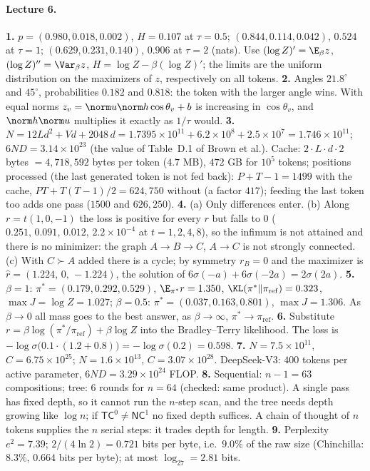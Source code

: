 \paragraph{Lecture 6.}
\textbf{1.} $p=(0.980,0.018,0.002)$, $H=0.107$ at $\tau=0.5$; $(0.844,0.114,0.042)$, $0.524$ at $\tau=1$; $(0.629,0.231,0.140)$, $0.906$ at $\tau=2$ (nats). Use $(\log Z)'=\E_\beta z$, $(\log Z)''=\Var_\beta z$, $H=\log Z-\beta(\log Z)'$; the limits are the uniform distribution on the maximizers of $z$, respectively on all tokens. \quad
\textbf{2.} Angles $21.8^\circ$ and $45^\circ$, probabilities $0.182$ and $0.818$: the token with the larger angle wins. With equal norms $z_v=\norm u\norm h\cos\theta_v+b$ is increasing in $\cos\theta_v$, and $\norm h\norm u$ multiplies it exactly as $1/\tau$ would. \quad
\textbf{3.} $N=12Ld^2+Vd+2048\,d=1.7395\times10^{11}+6.2\times10^{8}+2.5\times10^{7}=1.746\times10^{11}$; $6ND=3.14\times10^{23}$ (the value of Table~D.1 of Brown et al.). Cache: $2\cdot L\cdot d\cdot2$ bytes $=4{,}718{,}592$ bytes per token ($4.7$ MB), $472$ GB for $10^5$ tokens; positions processed (the last generated token is not fed back): $P+T-1=1499$ with the cache, $PT+T(T-1)/2=624{,}750$ without (a factor $417$); feeding the last token too adds one pass ($1500$ and $626{,}250$). \quad
\textbf{4.} (a) Only differences enter. (b) Along $r=t(1,0,-1)$ the loss is positive for every $r$ but falls to $0$ ($0.251,\,0.091,\,0.012,\,2.2\times10^{-4}$ at $t=1,2,4,8$), so the infimum is not attained and there is no minimizer: the graph $A\to B\to C$, $A\to C$ is not strongly connected. (c) With $C\succ A$ added there is a cycle; by symmetry $r_B=0$ and the maximizer is $\hat r=(1.224,\,0,\,-1.224)$, the solution of $6\sigma(-a)+6\sigma(-2a)=2\sigma(2a)$. \quad
\textbf{5.} $\beta=1$: $\pi^*=(0.179,0.292,0.529)$, $\E_{\pi^*}r=1.350$, $\KL(\pi^*\|\pi_{\mathrm{ref}})=0.323$, $\max J=\log Z=1.027$; $\beta=0.5$: $\pi^*=(0.037,0.163,0.801)$, $\max J=1.306$. As $\beta\to0$ all mass goes to the best answer, as $\beta\to\infty$, $\pi^*\to\pi_{\mathrm{ref}}$. \quad
\textbf{6.} Substitute $r=\beta\log(\pi^*/\pi_{\mathrm{ref}})+\beta\log Z$ into the Bradley--Terry likelihood. The loss is $-\log\sigma\big(0.1\cdot(1.2+0.8)\big)=-\log\sigma(0.2)=0.598$. \quad
\textbf{7.} $N=7.5\times10^{11}$, $C=6.75\times10^{25}$; $N=1.6\times10^{13}$, $C=3.07\times10^{28}$. DeepSeek-V3: $400$ tokens per active parameter, $6ND=3.29\times10^{24}$ FLOP. \quad
\textbf{8.} Sequential: $n-1=63$ compositions; tree: $6$ rounds for $n=64$ (checked: same product). A single pass has fixed depth, so it cannot run the $n$-step scan, and the tree needs depth growing like $\log n$; if $\mathsf{TC}^0\ne\mathsf{NC}^1$ no fixed depth suffices. A chain of thought of $n$ tokens supplies the $n$ serial steps: it trades depth for length. \quad
\textbf{9.} Perplexity $e^{2}=7.39$; $2/(4\ln2)=0.721$ bits per byte, i.e.\ $9.0\%$ of the raw size (Chinchilla: $8.3\%$, $0.664$ bits per byte); at most $\log_27=2.81$ bits.

